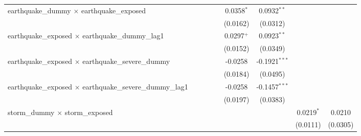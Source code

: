 \begin{tabular}{lcccccccc}
   earthquake\_dummy $\times$ earthquake\_exposed                    &                       &                       &                       &                       & 0.0358$^{*}$          & 0.0932$^{**}$         &                       &   \\   
                                                                     &                       &                       &                       &                       & (0.0162)              & (0.0312)              &                       &   \\   
   earthquake\_exposed $\times$ earthquake\_dummy\_lag1              &                       &                       &                       &                       & 0.0297$^{+}$          & 0.0923$^{**}$         &                       &   \\   
                                                                     &                       &                       &                       &                       & (0.0152)              & (0.0349)              &                       &   \\   
   earthquake\_exposed $\times$ earthquake\_severe\_dummy            &                       &                       &                       &                       & -0.0258               & -0.1921$^{***}$       &                       &   \\   
                                                                     &                       &                       &                       &                       & (0.0184)              & (0.0495)              &                       &   \\   
   earthquake\_exposed $\times$ earthquake\_severe\_dummy\_lag1      &                       &                       &                       &                       & -0.0258               & -0.1457$^{***}$       &                       &   \\   
                                                                     &                       &                       &                       &                       & (0.0197)              & (0.0383)              &                       &   \\   
   storm\_dummy $\times$ storm\_exposed                              &                       &                       &                       &                       &                       &                       & 0.0219$^{*}$          & 0.0210\\   
                                                                     &                       &                       &                       &                       &                       &                       & (0.0111)              & (0.0305)\\   

\end{tabular}
